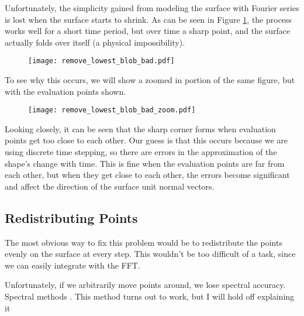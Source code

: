 Unfortunately, the simplicity gained from modeling the surface with Fourier series is lost when the surface starts to shrink. As can be seen in Figure \ref{fig:remove-lowest-blob-bad}, the process works well for a short time period, but over time a sharp point, and the surface actually folds over itself (a physical impossibility).


\begin{figure}[H]
    \begin{center}
      \texttt{[image: remove\_lowest\_blob\_bad.pdf]}
    \end{center}
  \vspace{-.2in} %
  \caption{\label{fig:remove-lowest-blob-bad}}
\end{figure}

To see why this occurs, we will show a zoomed in portion of the same figure, but with the evaluation points shown. 

\begin{figure}[H]
    \begin{center}
      \texttt{[image: remove\_lowest\_blob\_bad\_zoom.pdf]}
    \end{center}
  \vspace{-.2in} %
  \caption{\label{fig:remove-lowest-blog-bad-zoom}}
\end{figure}

Looking closely, it can be seen that the sharp corner forms when evaluation points get too close to each other. Our guess is that this occurs because we are using discrete time stepping, so there are errors in the approximation of the shape's change with time. This is fine when the evaluation points are far from each other, but when they get close to each other, the errors become significant and affect the direction of the surface unit normal vectors. 

\subsection*{Redistributing Points}

The most obvious way to fix this problem would be to redistribute the points evenly on the surface at every step. This wouldn't be too difficult of a task, since we can easily integrate with the FFT. 

Unfortunately, if we arbitrarily move points around, we lose spectral accuracy. Spectral methods . This method turns out to work, but I will hold off explaining it 

